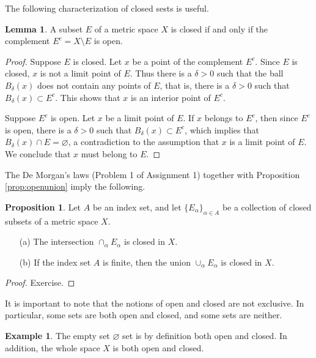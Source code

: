 \documentclass[12pt]{article}
\theoremstyle{definition}
\newtheorem{example}[definition]{Example}
\theoremstyle{theorem}
\newtheorem{proposition}[definition]{Proposition}
\newtheorem{lemma}[definition]{Lemma}
\begin{document}
The following characterization of closed sests is useful. 

\begin{lemma}
A subset $E$ of a metric space $X$ is closed if and only if the complement $E^c = X \setminus E$ is open. 
\end{lemma}

\begin{proof}
Suppose $E$ is closed. Let $x$ be a point of the complement $E^c$. Since $E$ is closed, $x$ is not a limit point of $E$. Thus there is a $\delta > 0$ such that the ball $B_\delta(x)$ does not contain any points of $E$, that is, there is a $\delta > 0$ such that $B_\delta(x) \subset E^c$. This shows that $x$ is an interior point of $E^c$. 

Suppose $E^c$ is open. Let $x$ be a limit point of $E$. If $x$ belongs to $E^c$, then since $E^c$ is open, there is a $\delta > 0$ such that $B_\delta(x) \subset E^c$, which implies that $B_\delta(x) \cap E = \varnothing$, a contradiction to the assumption that $x$ is a limit point of $E$. We conclude that $x$ must belong to $E$. 
\end{proof}

The De Morgan's laws (Problem 1 of Assignment 1) together with Proposition \ref{prop:openunion} imply the following. 

\begin{proposition}
Let $A$ be an index set, and let $\{E_\alpha\}_{\alpha \in A}$ be a collection of closed subsets of a metric space $X$. 
\begin{enumerate}
\item[(a)] The intersection $\cap_\alpha E_\alpha$ is closed in $X$. 
\item[(b)] If the index set $A$ is finite, then the union $\cup_\alpha E_\alpha$ is closed in $X$. 
\end{enumerate}
\end{proposition}

\begin{proof}
Exercise. 
\end{proof}

It is important to note that the notions of open and closed are not exclusive. In particular, some sets are both open and closed, and some sets are neither. 

\begin{example}
The empty set $\varnothing$ set is by definition both open and closed. In addition, the whole space $X$ is both open and closed. 
\end{example}
\end{document}
